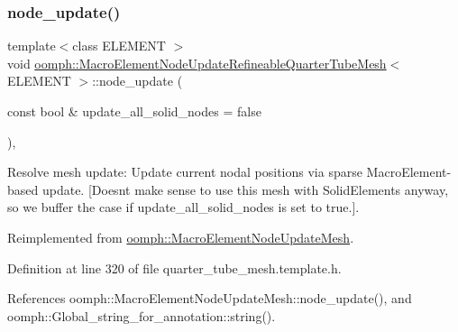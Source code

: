 \subsubsection{\texorpdfstring{node\+\_\+update()}{node\_update()}}
{\footnotesize\ttfamily template$<$class E\+L\+E\+M\+E\+NT $>$ \\
void \hyperlink{classoomph_1_1MacroElementNodeUpdateRefineableQuarterTubeMesh}{oomph\+::\+Macro\+Element\+Node\+Update\+Refineable\+Quarter\+Tube\+Mesh}$<$ E\+L\+E\+M\+E\+NT $>$\+::node\+\_\+update (\begin{DoxyParamCaption}\item[{const bool \&}]{update\+\_\+all\+\_\+solid\+\_\+nodes = {\ttfamily false} }\end{DoxyParamCaption})\hspace{0.3cm}{\ttfamily [inline]}, {\ttfamily [virtual]}}



Resolve mesh update\+: Update current nodal positions via sparse Macro\+Element-\/based update. \mbox{[}Doesn\textquotesingle{}t make sense to use this mesh with Solid\+Elements anyway, so we buffer the case if update\+\_\+all\+\_\+solid\+\_\+nodes is set to true.\mbox{]}. 



Reimplemented from \hyperlink{classoomph_1_1MacroElementNodeUpdateMesh_ab5271c4514bcd236271307361423ac9d}{oomph\+::\+Macro\+Element\+Node\+Update\+Mesh}.



Definition at line 320 of file quarter\+\_\+tube\+\_\+mesh.\+template.\+h.



References oomph\+::\+Macro\+Element\+Node\+Update\+Mesh\+::node\+\_\+update(), and oomph\+::\+Global\+\_\+string\+\_\+for\+\_\+annotation\+::string().

\mbox{\label{classoomph_1_1MacroElementNodeUpdateRefineableQuarterTubeMesh_ae98ab46cf2030928d805894dffe1b642}} 
